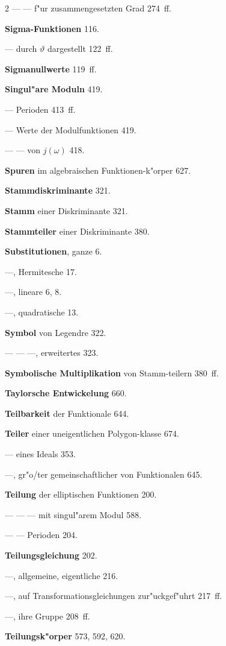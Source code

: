 \documentclass[12pt,a4paper]{article}
\begin{document}
\begin{multicols}{2}
--- --- f"ur zusammengesetzten Grad 274~ff.

\textbf{Sigma-Funktionen} 116.

--- durch $\vartheta$ dargestellt 122~ff.

\textbf{Sigmanullwerte} 119~ff.

\textbf{Singul"are Moduln} 419.

--- Perioden 413~ff.

--- Werte der Modulfunktionen 419.

--- --- von $j(\omega)$ 418.

\textbf{Spuren} im algebraischen Funktionen{-}k"orper 627.

\textbf{Stammdiskriminante} 321.

\textbf{Stamm} einer Diskriminante 321.

\textbf{Stammteiler} einer Diskriminante 380.

\textbf{Substitutionen}, ganze 6.

---, Hermitesche 17.

---, lineare 6, 8.

---, quadratische 13.

\textbf{Symbol} von Legendre 322.

--- --- ---, erweitertes 323.

\textbf{Symbolische Multiplikation} von Stamm{-}teilern 380~ff.

\bigskip

\textbf{Taylorsche Entwickelung} 660.

\textbf{Teilbarkeit} der Funktionale 644.

\textbf{Teiler} einer uneigentlichen Polygon{-}klasse 674.

--- eines Ideals 353.

---, gr"o{/}ter gemeinschaftlicher von Funktionalen 645.

\textbf{Teilung} der elliptischen Funktionen 200.

--- --- --- mit singul"arem Modul 588.

--- --- Perioden 204.

\textbf{Teilungsgleichung} 202.

---, allgemeine, eigentliche 216.

---, auf Transformationsgleichungen zur"uckgef"uhrt 217~ff.

---, ihre Gruppe 208~ff.

\bigskip

\textbf{Teilungsk"orper} 573, 592, 620.


\end{multicols}
\end{document}
